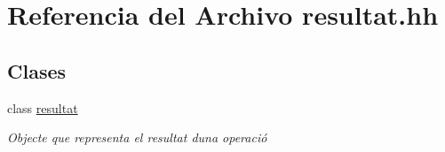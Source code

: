 \hypertarget{resultat_8hh}{}\section{Referencia del Archivo resultat.\+hh}
\label{resultat_8hh}
\subsection*{Clases}
\begin{DoxyCompactItemize}
\item 
class \hyperlink{classresultat}{resultat}
\begin{DoxyCompactList}\small\item\em Objecte que representa el resultat d\textquotesingle{}una operació \end{DoxyCompactList}\end{DoxyCompactItemize}
